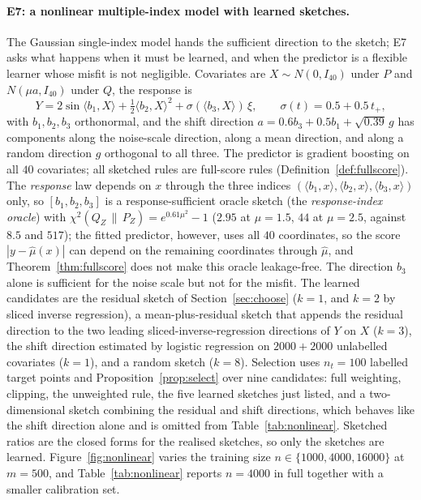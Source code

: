 \documentclass[11pt,a4paper]{article}
\newcommand{\chisqZ}{\chi^2(Q_Z\,\|\,P_Z)}
\theoremstyle{plain}
\theoremstyle{definition}
\theoremstyle{remark}
\begin{document}
\paragraph{E7: a nonlinear multiple-index model with learned sketches.}
The Gaussian single-index model hands the sufficient direction to the sketch; E7 asks what happens when it must be learned, and when the predictor is a flexible learner whose misfit is not negligible. Covariates are $X\sim N(0,I_{40})$ under $P$ and $N(\mu a,I_{40})$ under $Q$, the response is
\[
Y=2\sin\langle b_1,X\rangle+\tfrac12\langle b_2,X\rangle^2+\sigma(\langle b_3,X\rangle)\,\xi,\qquad\sigma(t)=0.5+0.5\,t_+,
\]
with $b_1,b_2,b_3$ orthonormal, and the shift direction $a=0.6b_3+0.5b_1+\sqrt{0.39}\,g$ has components along the noise-scale direction, along a mean direction, and along a random direction $g$ orthogonal to all three. The predictor is gradient boosting on all $40$ covariates; all sketched rules are full-score rules (Definition~\ref{def:fullscore}). The \emph{response} law depends on $x$ through the three indices $(\langle b_1,x\rangle,\langle b_2,x\rangle,\langle b_3,x\rangle)$ only, so $[b_1,b_2,b_3]$ is a response-sufficient oracle sketch (the \emph{response-index oracle}) with $\chisqZ=e^{0.61\mu^2}-1$ ($2.95$ at $\mu=1.5$, $44$ at $\mu=2.5$, against $8.5$ and $517$); the fitted predictor, however, uses all $40$ coordinates, so the score $|y-\hat\mu(x)|$ can depend on the remaining coordinates through $\hat\mu$, and Theorem~\ref{thm:fullscore} does not make this oracle leakage-free. The direction $b_3$ alone is sufficient for the noise scale but not for the misfit. The learned candidates are the residual sketch of Section~\ref{sec:choose} ($k=1$, and $k=2$ by sliced inverse regression), a mean-plus-residual sketch that appends the residual direction to the two leading sliced-inverse-regression directions of $Y$ on $X$ ($k=3$), the shift direction estimated by logistic regression on $2000+2000$ unlabelled covariates ($k=1$), and a random sketch ($k=8$). Selection uses $n_t=100$ labelled target points and Proposition~\ref{prop:select} over nine candidates: full weighting, clipping, the unweighted rule, the five learned sketches just listed, and a two-dimensional sketch combining the residual and shift directions, which behaves like the shift direction alone and is omitted from Table~\ref{tab:nonlinear}. Sketched ratios are the closed forms for the realised sketches, so only the sketches are learned. Figure~\ref{fig:nonlinear} varies the training size $n\in\{1000,4000,16000\}$ at $m=500$, and Table~\ref{tab:nonlinear} reports $n=4000$ in full together with a smaller calibration set.
\end{document}
